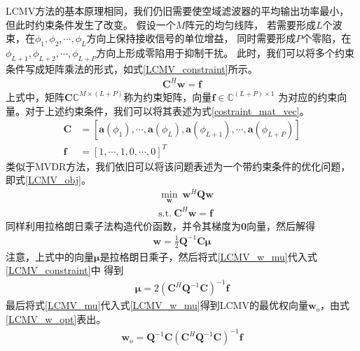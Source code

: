 \documentclass[master]{thesis-uestc}
\begin{document}
LCMV方法的基本原理相同，我们仍旧需要使空域滤波器的平均输出功率最小，但此时约束条件发生了改变。
假设一个$M$阵元的均匀线阵，
若需要形成$L$个波束，在$\phi_1,\phi_2,\cdots,\phi_L$方向上保持接收信号的单位增益，
同时需要形成$P$个零陷，在$\phi_{L+1},\phi_{L+2},\cdots,\phi_{L+P}$方向上形成零陷用于抑制干扰。
此时，我们可以将多个约束条件写成矩阵乘法的形式，如式\eqref{LCMV_constraint}所示。
\begin{equation}\label{LCMV_constraint}
    \begin{aligned}
        \bm{C}^H\bm{w} = \bm{f}
    \end{aligned}
\end{equation}
上式中，矩阵$\bm{C}\mathbb{C}^{M\times(L+P)}$称为约束矩阵，向量$\bm{f}\in\mathbb{C}^{(L+P)\times1}$
为对应的约束向量。对于上述约束条件，我们可以将其表述为式\eqref{costraint_mat_vec}。
\begin{subequations}\label{costraint_mat_vec}
    \begin{align}
        \bm{C} &= \left[\bm{a}(\phi_1), \cdots, \bm{a}(\phi_L), 
                        \bm{a}(\phi_{L+1}), \cdots, \bm{a}(\phi_{L+P})\right]
        \\
        \bm{f} &= \left[1, \cdots, 1, 0, \cdots, 0\right]^T
    \end{align}
\end{subequations}
类似于MVDR方法，我们依旧可以将该问题表述为一个带约束条件的优化问题，即式\eqref{LCMV_obj}。
\begin{equation}\label{LCMV_obj}
    \begin{aligned}
        &\min_\bm{w} ~ \bm{w}^H\bm{Q}\bm{w} \\
        &\text{s.t.} ~ \bm{C}^H\bm{w} = \bm{f}
    \end{aligned}
\end{equation}
同样利用拉格朗日乘子法构造代价函数，并令其梯度为$\textbf{0}$向量，然后解得
\begin{equation}\label{LCMV_w_mu}
    \begin{aligned}
    \bm{w} = \frac{1}{2}\bm{Q}^{-1}\bm{C}\bm{\mu}
    \end{aligned}
\end{equation}
注意，上式中的向量$\bm{\mu}$是拉格朗日乘子，然后将式\eqref{LCMV_w_mu}代入式\eqref{LCMV_constraint}中
得到
\begin{equation}\label{LCMV_mu}
    \begin{aligned}
        \bm{\mu} = 2\left(\bm{C}^H\bm{Q}^{-1}\bm{C}\right)^{-1}\bm{f}
    \end{aligned}
\end{equation}
最后将式\eqref{LCMV_mu}代入式\eqref{LCMV_w_mu}得到LCMV的最优权向量$\bm{w}_o$，由式\eqref{LCMV_w_opt}表出。
\begin{equation}\label{LCMV_w_opt}
    \begin{aligned}
        \bm{w}_o = \bm{Q}^{-1}\bm{C}\left(\bm{C}^H\bm{Q}^{-1}\bm{C}\right)^{-1}\bm{f}
    \end{aligned}
\end{equation}
\end{document}
